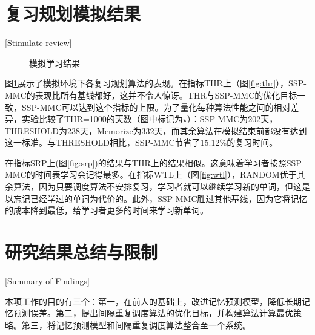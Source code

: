 \section{复习规划模拟结果}[Stimulate review]

\begin{figure}[htbp]
    \begin{minipage}{\textwidth}
    \centering
    \subfigure{\label{fig:thr}}\addtocounter{subfigure}{-2}
    \hspace{2em}
    \subfigure{\label{fig:srp}}\addtocounter{subfigure}{-2}
    \end{minipage}
    \centering
    \begin{minipage}{\textwidth}
    \centering
    \subfigure{\label{fig:wtl}}\addtocounter{subfigure}{-2}
    \hspace{2em}
    \subfigure{\label{fig:new}}\addtocounter{subfigure}{-2}
    \end{minipage}
    \vspace{0.2em}
    \caption{模拟学习结果}
    \label{fig:simulation}
\end{figure}

图\ref{fig:simulation}展示了模拟环境下各复习规划算法的表现。在指标THR上（图\ref{fig:thr}），SSP-MMC的表现比所有基线都好，这并不令人惊讶。THR与SSP-MMC的优化目标一致，SSP-MMC可以达到这个指标的上限。为了量化每种算法性能之间的相对差异，实验比较了THR=1000的天数（图中标记为$\star$）：SSP-MMC为202天，THRESHOLD为238天，Memorize为332天，而其余算法在模拟结束前都没有达到这一标准。与THRESHOLD相比，SSP-MMC节省了15.12\%的复习时间。

在指标SRP上(图\ref{fig:srp})的结果与THR上的结果相似。这意味着学习者按照SSP-MMC的时间表学习会记得最多。在指标WTL上（图\ref{fig:wtl}），RANDOM优于其余算法，因为只要调度算法不安排复习，学习者就可以继续学习新的单词，但这是以忘记已经学过的单词为代价的。此外，SSP-MMC胜过其他基线，因为它将记忆的成本降到最低，给学习者更多的时间来学习新单词。

\section{研究结果总结与限制}[Summary of Findings]

本项工作的目的有三个：第一，在前人的基础上，改进记忆预测模型，降低长期记忆预测误差。第二，提出间隔重复调度算法的优化目标，并构建算法计算最优策略。第三，将记忆预测模型和间隔重复调度算法整合至一个系统。

